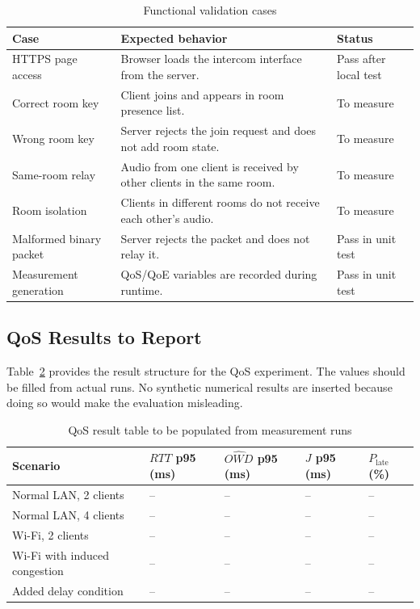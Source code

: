 \documentclass[conference]{IEEEtran}
\begin{document}
\begin{table}[H]
\centering
\caption{Functional validation cases}
\label{tab:functional}
\renewcommand{\arraystretch}{1.15}
\begin{tabularx}{\columnwidth}{lXl}
\toprule
\textbf{Case} & \textbf{Expected behavior} & \textbf{Status} \\
\midrule
HTTPS page access & Browser loads the intercom interface from the server. & Pass after local test \\
Correct room key & Client joins and appears in room presence list. & To measure \\
Wrong room key & Server rejects the join request and does not add room state. & To measure \\
Same-room relay & Audio from one client is received by other clients in the same room. & To measure \\
Room isolation & Clients in different rooms do not receive each other's audio. & To measure \\
Malformed binary packet & Server rejects the packet and does not relay it. & Pass in unit test \\
Measurement generation & QoS/QoE variables are recorded during runtime. & Pass in unit test \\
\bottomrule
\end{tabularx}
\end{table}

\subsection{QoS Results to Report}

Table~\ref{tab:qos_results} provides the result structure for the QoS experiment. The values should be filled from actual runs. No synthetic numerical results are inserted because doing so would make the evaluation misleading.

\begin{table}[H]
\centering
\caption{QoS result table to be populated from measurement runs}
\label{tab:qos_results}
\renewcommand{\arraystretch}{1.15}
\begin{tabularx}{\columnwidth}{lXXXX}
\toprule
\textbf{Scenario} & \textbf{$RTT$ p95 (ms)} & \textbf{$\widehat{OWD}$ p95 (ms)} & \textbf{$J$ p95 (ms)} & \textbf{$P_{\mathrm{late}}$ (\%)} \\
\midrule
Normal LAN, 2 clients & -- & -- & -- & -- \\
Normal LAN, 4 clients & -- & -- & -- & -- \\
Wi-Fi, 2 clients & -- & -- & -- & -- \\
Wi-Fi with induced congestion & -- & -- & -- & -- \\
Added delay condition & -- & -- & -- & -- \\
\bottomrule
\end{tabularx}
\end{table}
\end{document}
